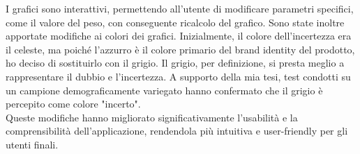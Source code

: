 I grafici sono interattivi, permettendo all'utente di modificare parametri specifici, come il valore del peso, con conseguente ricalcolo del grafico. Sono state inoltre apportate modifiche ai colori dei grafici. Inizialmente, il colore dell'incertezza era il celeste, ma poiché l'azzurro è il colore primario del brand identity del prodotto, ho deciso di sostituirlo con il grigio. Il grigio, per definizione, si presta meglio a rappresentare il dubbio e l'incertezza. A supporto della mia tesi, test condotti su un campione demograficamente variegato hanno confermato che il grigio è percepito come colore "incerto".\\

Queste modifiche hanno migliorato significativamente l'usabilità e la comprensibilità dell'applicazione, rendendola più intuitiva e user-friendly per gli utenti finali.